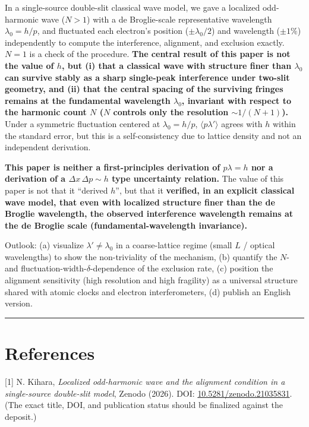 \documentclass[11pt,a4paper]{article}
\begin{document}
In a single-source double-slit classical wave model, we gave a localized
odd-harmonic wave (\(N>1\)) with a de Broglie-scale representative
wavelength \(\lambda_0=h/p\), and fluctuated each electron's position
(\(\pm\lambda_0/2\)) and wavelength (\(\pm1\%\)) independently to
compute the interference, alignment, and exclusion exactly. \(N=1\) is a
check of the procedure. \textbf{The central result of this paper is not
the value of \(h\), but (i) that a classical wave with structure finer
than \(\lambda_0\) can survive stably as a sharp single-peak
interference under two-slit geometry, and (ii) that the central spacing
of the surviving fringes remains at the fundamental wavelength
\(\lambda_0\), invariant with respect to the harmonic count \(N\) (\(N\)
controls only the resolution \(\sim1/(N{+}1)\)).} Under a symmetric
fluctuation centered at \(\lambda_0=h/p\), \(\langle p\lambda'\rangle\)
agrees with \(h\) within the standard error, but this is a
self-consistency due to lattice density and not an independent
derivation.

\textbf{This paper is neither a first-principles derivation of
\(p\lambda=h\) nor a derivation of a \(\Delta x\,\Delta p\sim h\) type
uncertainty relation.} The value of this paper is not that it ``derived
\(h\)'', but that it \textbf{verified, in an explicit classical wave
model, that even with localized structure finer than the de Broglie
wavelength, the observed interference wavelength remains at the de
Broglie scale (fundamental-wavelength invariance).}

Outlook: (a) visualize \(\lambda'\ne\lambda_0\) in a coarse-lattice
regime (small \(L\) / optical wavelengths) to show the non-triviality of
the mechanism, (b) quantify the \(N\)- and
fluctuation-width-\(\delta\)-dependence of the exclusion rate, (c)
position the alignment sensitivity (high resolution and high fragility)
as a universal structure shared with atomic clocks and electron
interferometers, (d) publish an English version.

\begin{center}\rule{0.5\linewidth}{0.5pt}\end{center}

\section{References}\label{references}

{[}1{]} N. Kihara, \emph{Localized odd-harmonic wave and the alignment
condition in a single-source double-slit model}, Zenodo (2026). DOI:
\href{https://doi.org/10.5281/zenodo.21035831}{10.5281/zenodo.21035831}.
(The exact title, DOI, and publication status should be finalized
against the deposit.)
\end{document}
